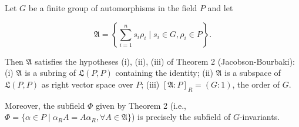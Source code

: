 Let $G$ be a finite group of automorphisms in the field $P$ and let

$$\mathfrak{A} = \left\{ \sum_{i=1}^{n} s_i \rho_i \mid s_i \in G, \rho_i \in P \right\}.$$

Then $\mathfrak{A}$ satisfies the hypotheses (i), (ii), (iii) of Theorem 2 (Jacobson-Bourbaki):
(i) $\mathfrak{A}$ is a subring of $\mathfrak{L}(P, P)$ containing the identity;
(ii) $\mathfrak{A}$ is a subspace of $\mathfrak{L}(P, P)$ as right vector space over $P$;
(iii) $[\mathfrak{A}:P]_R = (G:1)$, the order of $G$.

Moreover, the subfield $\Phi$ given by Theorem 2 (i.e., $\Phi = \{\alpha \in P \mid \alpha_R A = A \alpha_R, \forall A \in \mathfrak{A}\}$) is precisely the subfield of $G$-invariants.
